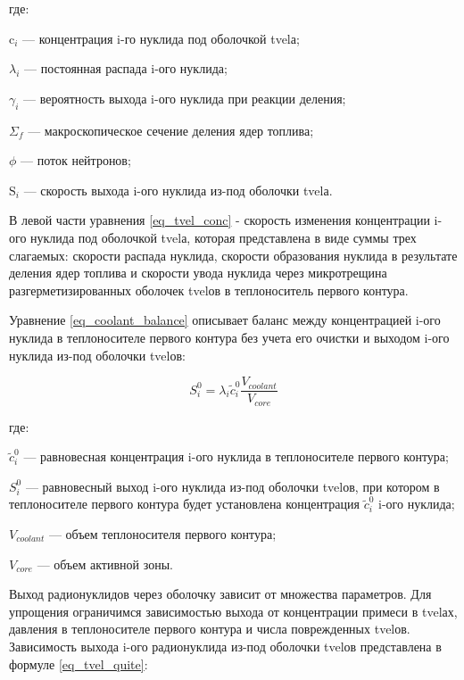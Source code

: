 где:
\begin{description}
    \item $\text{c}_i$ --- концентрация i-го нуклида под оболочкой \ac{tvel}а;
    \item $\lambda_{i}$ ---  постоянная распада i-ого нуклида;
    \item $\gamma_{i}$ --- вероятность выхода i-ого нуклида при реакции деления;
    \item $\Sigma_{f}$ --- макроскопическое сечение деления ядер топлива;
    \item $\phi$ --- поток нейтронов;
    \item $\text{S}_{i}$ --- скорость выхода i-ого нуклида из-под оболочки \ac{tvel}а.
\end{description}

В левой части уравнения \ref{eq_tvel_conc} - скорость изменения концентрации i-ого нуклида под оболочкой \ac{tvel}а, 
которая представлена в виде суммы трех слагаемых: скорости распада нуклида, скорости образования нуклида в результате 
деления ядер топлива и скорости увода нуклида через микротрещина разгерметизированных оболочек \ac{tvel}ов в 
теплоноситель первого контура.

Уравнение \ref{eq_coolant_balance} описывает баланс между концентрацией i-ого нуклида в теплоносителе первого контура 
без учета его очистки и выходом i-ого нуклида из-под оболочки \ac{tvel}ов:

\begin{equation}
    \label{eq_coolant_balance}
    S_{i}^{0} = \lambda_{i}\widetilde{c}_{i}^{0}\frac{V_{coolant}}{V_{core}}
\end{equation}

где:
\begin{description}
    \item $\widetilde{c}_{i}^{0}$ --- равновесная концентрация i-ого нуклида в теплоносителе первого контура;
    \item $S_{i}^{0}$ --- равновесный выход i-ого нуклида из-под оболочки \ac{tvel}ов, при котором в 
        теплоносителе первого контура будет установлена концентрация $\widetilde{c}_{i}^{0}$ i-ого нуклида;
    \item $V_{coolant}$ --- объем теплоносителя первого контура;
    \item $V_{core}$ --- объем активной зоны.
\end{description}

Выход радионуклидов через оболочку зависит от множества параметров. Для упрощения ограничимся зависимостью выхода от 
концентрации примеси в \ac{tvel}ах, давления в теплоносителе первого контура и числа поврежден­ных \ac{tvel}ов. 
Зависимость выхода i-ого радионуклида из-под оболочки \ac{tvel}ов представлена в формуле \ref{eq_tvel_quite}:

